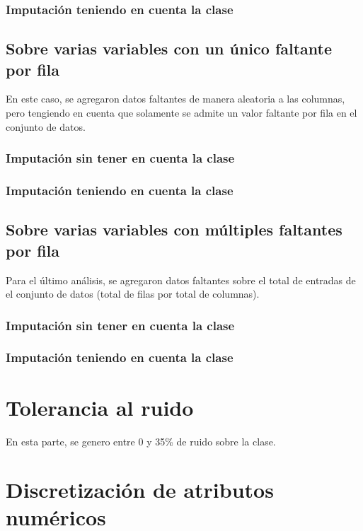 \documentclass[]{article}
\begin{document}
\subsubsection{Imputación teniendo en cuenta la clase}

\subsection{Sobre varias variables con un único faltante por fila}
En este caso, se agregaron datos faltantes de manera aleatoria a las columnas, pero tengiendo en cuenta que solamente se admite un valor faltante por fila en el conjunto de datos. 

\subsubsection{Imputación sin tener en cuenta la clase}

\subsubsection{Imputación teniendo en cuenta la clase}

\subsection{Sobre varias variables con múltiples faltantes por fila}
Para el último análisis, se agregaron datos faltantes sobre el total de entradas de el conjunto de datos (total de filas por total de columnas).

\subsubsection{Imputación sin tener en cuenta la clase}

\subsubsection{Imputación teniendo en cuenta la clase}

\section{Tolerancia al ruido}
En esta parte, se genero entre 0 y 35\% de ruido sobre la clase. 

\section{Discretización de atributos numéricos}
\end{document}
